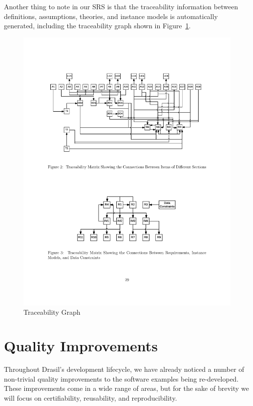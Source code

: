\documentclass[sigconf]{acmart}
\begin{document}
{Another thing to note in our SRS is that the traceability information between
definitions, assumptions, theories, and instance models is automatically 
generated, including the traceability graph shown in 
Figure~\ref{Fig_TraceGraph}.

\begin{figure}
\begin{center}
\includegraphics[scale=0.5]{./figures/TraceGraph.pdf}
\end{center}
\caption{Traceability Graph}
\label{Fig_TraceGraph}
\end{figure}

\section{Quality Improvements} \label{SecQuality}

Throughout Drasil's development lifecycle, we have already noticed a number of 
non-trivial quality improvements to the software examples being re-developed. 
These improvements come in a wide range of areas, but for the sake of brevity 
we will focus on certifiability, reusability, and reproducibility.

}
\end{document}

